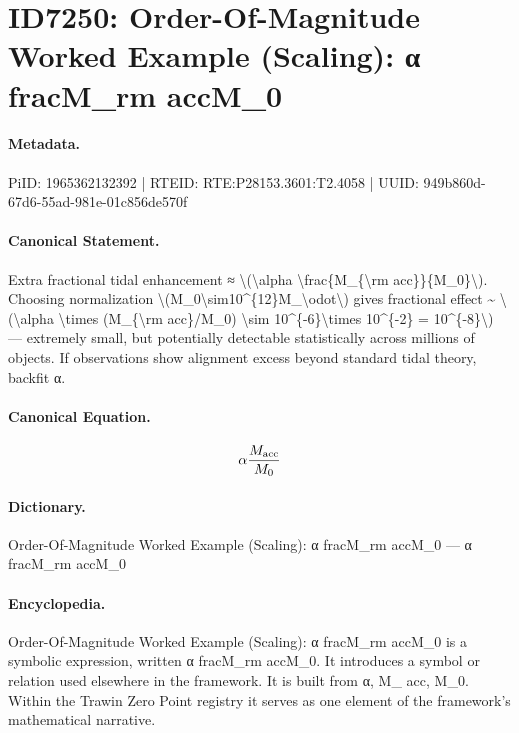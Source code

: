 \section*{ID7250: Order-Of-Magnitude Worked Example (Scaling): α fracM\_rm accM\_0}
\paragraph{Metadata.}
PiID: 1965362132392 | RTEID: RTE:P28153.3601:T2.4058 | UUID: 949b860d-67d6-55ad-981e-01c856de570f

\paragraph{Canonical Statement.}
Extra fractional tidal enhancement ≈ \textbackslash{}(\textbackslash{}alpha \textbackslash{}frac\{M\_\{\textbackslash{}rm acc\}\}\{M\_0\}\textbackslash{}). Choosing normalization \textbackslash{}(M\_0\textbackslash{}sim10\textasciicircum{}\{12\}M\_\textbackslash{}odot\textbackslash{}) gives fractional effect \textasciitilde{} \textbackslash{}(\textbackslash{}alpha \textbackslash{}times (M\_\{\textbackslash{}rm acc\}/M\_0) \textbackslash{}sim 10\textasciicircum{}\{-6\}\textbackslash{}times 10\textasciicircum{}\{-2\} = 10\textasciicircum{}\{-8\}\textbackslash{}) — extremely small, but potentially detectable statistically across millions of objects. If observations show alignment excess beyond standard tidal theory, backfit α.

\paragraph{Canonical Equation.}
\[
\alpha \frac{M_{\rm acc}}{M_0}
\]

\paragraph{Dictionary.}
Order-Of-Magnitude Worked Example (Scaling): α fracM\_rm accM\_0 — α fracM\_rm accM\_0

\paragraph{Encyclopedia.}
Order-Of-Magnitude Worked Example (Scaling): α fracM\_rm accM\_0 is a symbolic expression, written α fracM\_rm accM\_0. It introduces a symbol or relation used elsewhere in the framework. It is built from α, M\_ acc, M\_0. Within the Trawin Zero Point registry it serves as one element of the framework's mathematical narrative.
